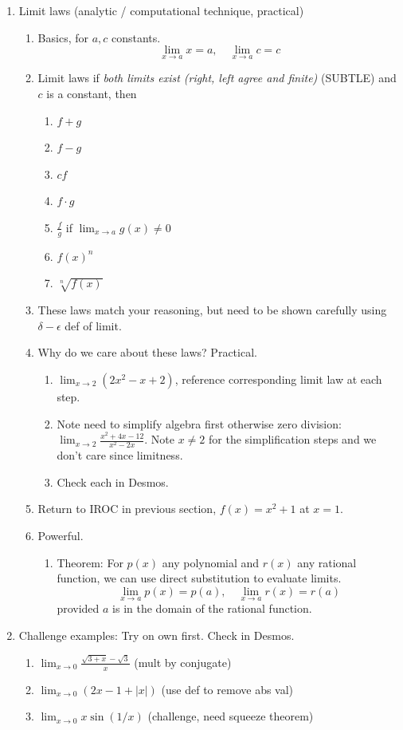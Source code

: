 \documentclass{article}
\newcommand{\ds}{\displaystyle}
\begin{document}
\begin{enumerate}
\item Limit laws (analytic / computational technique, practical)
\begin{enumerate}
\item Basics, for $a,c$ constants.
$$
\lim_{x\rightarrow a} x = a,\quad \lim_{x\rightarrow a} c = c
$$
\item Limit laws if \emph{both limits exist (right, left agree and finite)} (SUBTLE) and $c$ is a constant, then 
\begin{enumerate}
\item $f+g$
\item $f-g$
\item $cf$
\item  $f\cdot g$
\item $\frac{f}{g}$ if $\lim_{x\rightarrow a} g(x) \neq 0$
\item $f(x)^n$
\item $\sqrt[n]{f(x)}$
\end{enumerate}
\item These laws match your reasoning, but need to be shown carefully using $\delta- \epsilon$ def of limit.
\item Why do we care about these laws? Practical. 
\begin{enumerate}
\item $ \ds \lim_{x\rightarrow 2} \left( 2x^2 - x + 2\right) $, reference corresponding limit law at each step.
\item Note need to simplify algebra first otherwise zero division: $\ds \lim_{x \rightarrow 2} \frac{x^2 + 4x - 12}{x^2-2x}$. Note $x \neq 2$ for the simplification steps and we don't care since limitness.
\item Check each in Desmos.
\end{enumerate}
\item Return to IROC in previous section, $f(x)=x^2+1$ at $x=1$. 
\item Powerful. 
\begin{enumerate}
\item Theorem: For $p(x)$ any polynomial and $r(x)$ any rational function, we can use direct substitution to evaluate limits.
\[
\lim_{x\rightarrow a} p(x) = p(a), \quad \lim_{x\rightarrow a} r(x) = r(a)
\]
provided $a$ is in the domain of the rational function. 
\end{enumerate}
\end{enumerate}

\item Challenge examples: Try on own first. Check in Desmos.
\begin{enumerate}
\item $\lim_{x \rightarrow 0} \frac{\sqrt{3+x}-\sqrt{3}}{x}$ (mult by conjugate)
\item $\lim_{x \rightarrow 0} (2x-1+|x|)$ (use def to remove abs val)
\item $\lim_{x \rightarrow 0} x \sin(1/x)$ (challenge, need squeeze theorem)
\end{enumerate}


\end{enumerate}
\end{document}
